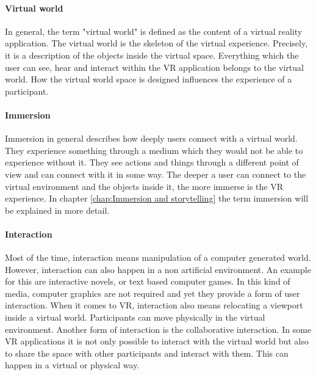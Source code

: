 \paragraph{Virtual world} In general, the term "virtual world" is defined as the content of a virtual reality application.  The virtual world is the skeleton of the virtual experience. Precisely, it is a description of the objects inside the virtual space. Everything which the user can see, hear and interact within the VR application belongs to the virtual world. How the virtual world space is designed influences the experience of a participant.

\paragraph{Immersion} Immersion in general describes how deeply users connect with a virtual world. They experience something through a medium which they would not be able to experience without it. They see actions and things through a different point of view and can connect with it in some way. The deeper a user can connect to the virtual environment and the objects inside it, the more immerse is the VR experience. In chapter \ref{chap:Immersion and storytelling} the term immersion will be explained in more detail.

\paragraph{Interaction} Most of the time, interaction means manipulation of a computer generated world. However, interaction can also happen in a non artificial environment. An example for this are interactive novels, or text based computer games. In this kind of media, computer graphics are not required and yet they provide a form of user interaction. When it comes to VR, interaction also means relocating a viewport inside a virtual world. Participants can move physically in the virtual environment. Another form of interaction is the collaborative interaction. In some VR applications it is not only possible to interact with the virtual world but also to share the space with other participants and interact with them. This can happen in a virtual or physical way.

